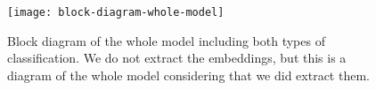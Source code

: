 	\begin{figure}[H]
		\centering
		\captionsetup{justification=centering}
		\texttt{[image: block-diagram-whole-model]}
		\caption{Block diagram of the whole model including both types of classification. We do not extract the embeddings, but this is a diagram of the whole model considering that we did extract them.}
		\label{fig:mesh54}
	\end{figure} 




















